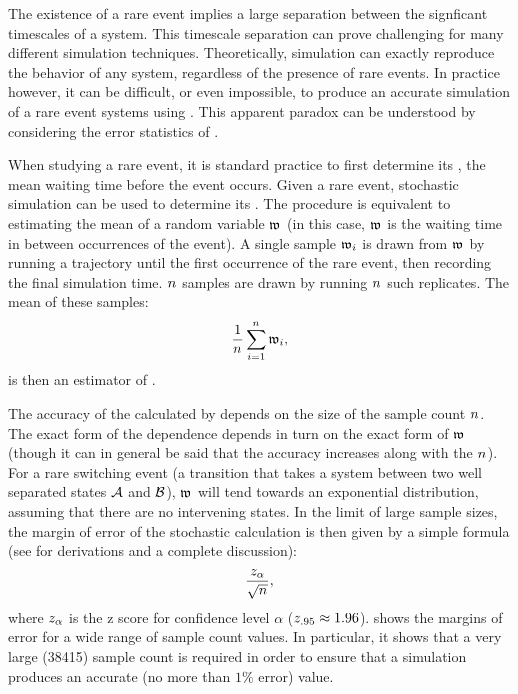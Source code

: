 The existence of a rare event implies a large separation between the signficant timescales of  a system. This timescale separation can prove challenging\supercite{Shampine:1979em,Petzold:1983if} for many different simulation techniques. Theoretically,  simulation can exactly reproduce the behavior of any system, regardless of the presence of rare events. In practice however, it can be difficult, or even impossible, to produce an accurate simulation of a rare event systems using . This apparent paradox can be understood by considering the error statistics of .


When studying a rare event, it is standard practice to first determine its , the mean waiting time before the event occurs. Given a rare event, stochastic simulation can be used to determine its . The procedure is equivalent to estimating the mean of a random variable $\mathfrak{w}_{}$ (in this case, $\mathfrak{w}_{}$ is the waiting time in between occurrences of the event). A single sample $\mathfrak{w}_{i}$ is drawn from $\mathfrak{w}_{}$ by running a trajectory until the first occurrence of the rare event, then recording the final simulation time. $n_{}$ samples are drawn by running $n_{}$ such replicates. The mean of these samples: 
\begin{equation*}
    \frac{1}{n_{}} \sum_{i=1}^{n_{}} \mathfrak{w}_{i}, 
\end{equation*}
is then an estimator of .

The accuracy of the  calculated by  depends on the size of the sample count $n_{}$. The exact form of the dependence depends in turn on the exact form of $\mathfrak{w}_{}$ (though it can in general be said that the accuracy increases along with the $n_{}$). For a rare switching event (\eg a transition that takes a system between two well separated states $\mathcal{A}$ and $\mathcal{B}$), $\mathfrak{w}_{}$ will tend towards an exponential distribution{\supercite{Aldous:1982ev}}, assuming that there are no intervening states. In the limit of large sample sizes, the margin of error of the stochastic  calculation is then given by a simple formula (see  for derivations and a complete discussion):
\begin{equation*}
    \frac{z_{\alpha}}{\sqrt{n_{}}},
\end{equation*}
where $z_{\alpha}$ is the z score for confidence level $\alpha$ (\ie $z_{.95} \approx 1.96$).  shows the margins of error for a wide range of sample count values. In particular, it shows that a very large (38415) sample count is required in order to ensure that a simulation produces an accurate (\ie no more than $1\%$ error)  value.

